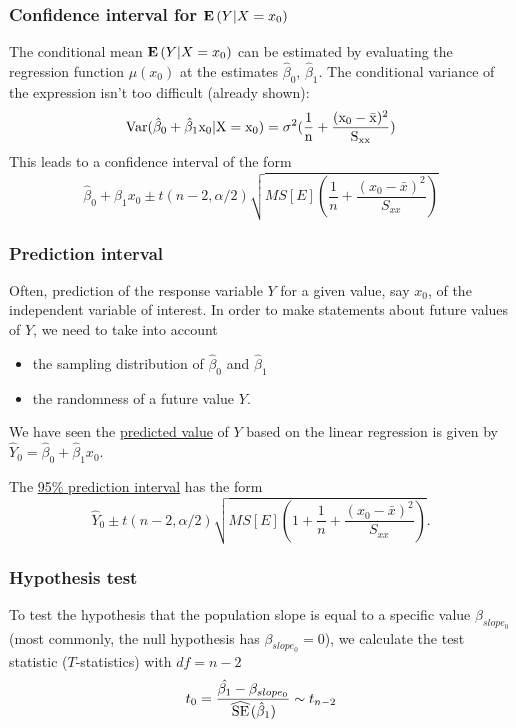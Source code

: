\subsubsection*{Confidence interval for ${\mathbf{E}\left(Y|X=x_0\right)}$}

The conditional mean ${\mathbf{E}\left(Y|X=x_0\right)}$ can be estimated by evaluating the regression function $\mu(x_0)$ at the estimates $\hat{\beta}_0$, $\hat{\beta}_1$.
The conditional variance of the expression isn't too difficult (already shown):
$$
\rm Var(\hat{\beta}_0 + \hat{\beta}_1 x_0 | X = x_0) = \sigma^2(\frac{1}{n} + \frac{(x_0 - \bar{x})^2}{S_{xx}})
$$
This leads to a confidence interval of the form
$$
\hat{\beta}_0 + \hat{\beta}_1 x_0 \pm t(n - 2, \alpha / 2) \sqrt{MS[E] \left( \frac{1}{n} + \frac{(x_0 - \bar{x})^2}{S_{xx}} \right)}
$$

\subsubsection*{Prediction interval}
Often, prediction of the response variable $Y$ for a given value, say $x_0$, of the independent variable of interest.
In order to make statements about future values of $Y$, we need to take into account
\begin{itemize}
  \item the sampling distribution of $\hat{\beta}_0$ and $\hat{\beta}_1$
  \item the randomness of a future value $Y$.
\end{itemize}

We have seen the \underline{predicted value} of $Y$ based on the linear regression is given by $\hat{Y}_0 = \hat{\beta}_0 + \hat{\beta}_1 x_0$.

The \underline{95\% prediction interval} has the form
$$
\hat{Y}_0 \pm t(n - 2, \alpha / 2) \sqrt{MS[E] \left( 1 + \frac{1}{n} + \frac{(x_0 - \bar{x})^2}{S_{xx}} \right)}.
$$



\subsubsection*{Hypothesis test}
To test the hypothesis  that the population slope is equal to a specific value $\beta_{slope_0}$ (most commonly, the null hypothesis has $\beta_{slope_0} = 0$),
we calculate the test statistic ($T$-statistics) with $df = n - 2$
$$
t_0 = \frac{\hat{\beta_1} - \beta_{slope_0}}{\reallywidehat{SE}(\hat{\beta}_1)} \sim t_{n-2}
$$



